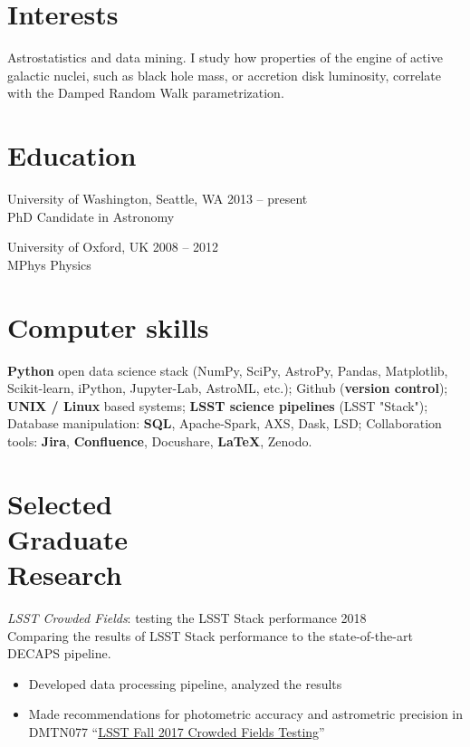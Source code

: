 \documentclass[margin]{res}
\begin{document}
\begin{resume}

\section{Interests} Astrostatistics and data mining. I study how properties of the engine of active galactic nuclei, such as black hole mass, or accretion disk luminosity, correlate with the Damped Random Walk parametrization.



\section{Education} 
University of Washington, Seattle, WA \hfill 2013 -- present\\
PhD Candidate in Astronomy

University of Oxford, UK \hfill 2008 -- 2012\\
MPhys Physics  

\section{Computer skills}
\textbf{Python} open data science stack (NumPy, SciPy, AstroPy, Pandas, Matplotlib, Scikit-learn, iPython, Jupyter-Lab, AstroML, etc.); 
Github (\textbf{version control});
\textbf{UNIX / Linux} based systems;
\textbf{LSST science pipelines} (LSST "Stack"); 
Database manipulation: \textbf{SQL}, Apache-Spark, AXS, Dask, LSD; 
Collaboration tools: \textbf{Jira}, \textbf{Confluence}, Docushare, \textbf{LaTeX}, Zenodo.


\section{Selected \\Graduate \\Research} 
{\sl LSST Crowded Fields}:  testing the LSST Stack performance  \hfill          2018\\
Comparing the results of LSST Stack performance to the state-of-the-art DECAPS pipeline. 
\begin{itemize}  \itemsep -2pt %
\item Developed data processing pipeline, analyzed the results 
\item Made recommendations for photometric accuracy and astrometric precision in DMTN077 ``\href{https://dmtn-077.lsst.io}{LSST Fall 2017 Crowded Fields Testing}''
\end{itemize}  


\end{resume}
\end{document}
